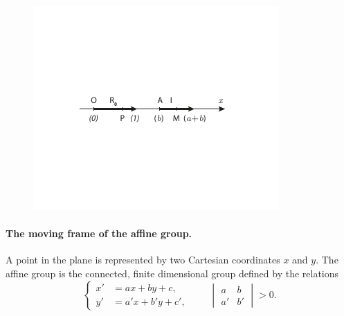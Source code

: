 \documentclass[leqno,11pt]{book}
\numberwithin{equation}{chapter}
\theoremstyle{shape1}
\theoremstyle{shapesmall}
\begin{document}
\begin{figure}[h]
  \centering
\includegraphics[scale=1.8]{cartangrp-f3}  
  \caption{}
  \label{fig:3}
\end{figure}


\paragraph{The moving frame of the affine group.}
\label{sec:65}
A point in the plane is represented by two Cartesian coordinates $x$ and $y$. The affine group is the connected, finite dimensional group defined by the relations
\begin{equation}
  \label{eq:5.4}
  \left\{
    \begin{aligned}
      x'&=ax+by+c,\\
      y'&=a'x+b'y+c',
    \end{aligned}
  \right.
  \qquad
  \begin{vmatrix}
    a&b\\
    a'&b'
  \end{vmatrix}
  >0.
\end{equation}
\end{document}
